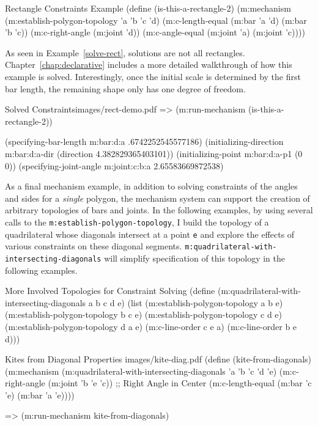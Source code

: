 \begin{code-example}
[label=is-rect-2]
{Rectangle Constraints Example}
(define (is-this-a-rectangle-2)
  (m:mechanism
   (m:establish-polygon-topology 'a 'b 'c 'd)
   (m:c-length-equal (m:bar 'a 'd) (m:bar 'b 'c))
   (m:c-right-angle (m:joint 'd))
   (m:c-angle-equal (m:joint 'a) (m:joint 'c))))
\end{code-example}

As seen in Example~\ref{solve-rect}, solutions are not all
rectangles.  Chapter~\ref{chap:declarative} includes a more detailed
walkthrough of how this example is solved. Interestingly, once the
initial scale is determined by the first bar length, the remaining
shape only has one degree of freedom.

\begin{pdf-example}
[label=solve-rect]
{Solved Constraints}{images/rect-demo.pdf}
=> (m:run-mechanism (is-this-a-rectangle-2))

(specifying-bar-length m:bar:d:a .6742252545577186)
(initializing-direction m:bar:d:a-dir (direction 4.382829365403101))
(initializing-point m:bar:d:a-p1 (0 0))
(specifying-joint-angle m:joint:c:b:a 2.65583669872538)
\end{pdf-example}

As a final mechanism example, in addition to solving constraints of
the angles and sides for a \emph{single} polygon, the mechanism system
can support the creation of arbitrary topologies of bars and
joints. In the following examples, by using several calls to the
\texttt{m:establish-polygon-topology}, I build the topology of a
quadrilateral whose diagonals intersect at a point \texttt{e} and
explore the effects of various constraints on these diagonal
segments. \texttt{m:quadrilateral-with-intersecting-diagonals} will
simplify specification of this topology in the following examples.

\begin{code-example}
[label=quad-diagonals]
{More Involved Topologies for Constraint Solving}
(define (m:quadrilateral-with-intersecting-diagonals a b c d e)
  (list (m:establish-polygon-topology a b e)
        (m:establish-polygon-topology b c e)
        (m:establish-polygon-topology c d e)
        (m:establish-polygon-topology d a e)
        (m:c-line-order c e a)
        (m:c-line-order b e d)))
\end{code-example}

\begin{pdf-example}
[label=kite-from-diag,
comment style={frame hidden,
opacityback=0,
height=5.6cm,
raster columns=2,graphics pages={1,2}}]
{Kites from Diagonal Properties}
{images/kite-diag.pdf}
(define (kite-from-diagonals)
  (m:mechanism
   (m:quadrilateral-with-intersecting-diagonals 'a 'b 'c 'd 'e)
   (m:c-right-angle (m:joint 'b 'e 'c)) ;; Right Angle in Center
   (m:c-length-equal (m:bar 'c 'e) (m:bar 'a 'e))))

=> (m:run-mechanism kite-from-diagonals)
\end{pdf-example}

